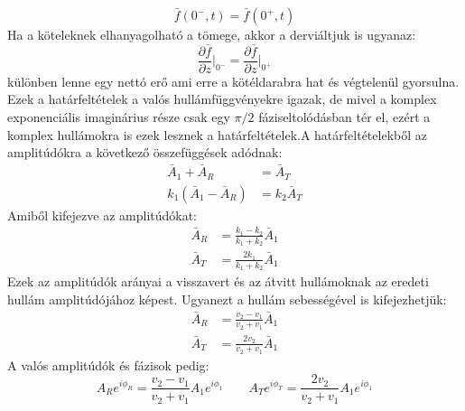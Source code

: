 \documentclass[../main.tex]{subfiles}
\begin{document}
\begin{equation}
    \bar{f}(0^-, t) = \bar{f}(0^+, t)
\end{equation}
Ha a köteleknek elhanyagolható a tömege, akkor a derviáltjuk is ugyanaz:
\begin{equation}
    \frac{\partial \bar{f}}{\partial z} \Big|_{0^-} = \frac{\partial \bar{f}}{\partial z} \Big|_{0^+}
\end{equation}
különben lenne egy nettó erő ami erre a kötéldarabra hat és végtelenül gyorsulna. Ezek a határfeltételek a valós hullámfüggvényekre igazak, de mivel a komplex exponenciális imaginárius része csak egy $\pi/2$ fáziseltolódásban tér el,
ezért a komplex hullámokra is ezek lesznek a határfeltételek.A határfeltételekből az amplitúdókra a következő összefüggések adódnak:
\begin{equation}
    \begin{aligned}
        \bar{A}_1 + \bar{A}_R &= \bar{A}_T \\
        k_1 (\bar{A}_1 - \bar{A}_R) &= k_2 \bar{A}_T
    \end{aligned}
\end{equation}
Amiből kifejezve az amplitúdókat:
\begin{equation}
    \begin{aligned}
        \bar{A}_R &= \frac{k_1 - k_2}{k_1 + k_2} \bar{A}_1 \\
        \bar{A}_T &= \frac{2 k_1}{k_1 + k_2} \bar{A}_1
    \end{aligned}
\end{equation}
Ezek az amplitúdók arányai a visszavert és az átvitt hullámoknak az eredeti hullám amplitúdójához képest. Ugyanezt a hullám sebességével is kifejezhetjük:
\begin{equation}
    \begin{aligned}
        \bar{A}_R &= \frac{v_2 - v_1}{v_2 + v_1} \bar{A}_1 \\
        \bar{A}_T &= \frac{2 v_2}{v_2 + v_1} \bar{A}_1
    \end{aligned}
\end{equation}
A valós amplitúdók és fázisok pedig:
\begin{equation}
    A_R e^{i \phi_R} = \frac{v_2 - v_1}{v_2 + v_1} A_1 e^{i \phi_1} \qquad A_T e^{i \phi_T} = \frac{2 v_2}{v_2 + v_1} A_1 e^{i \phi_1}
\end{equation}
\end{document}
